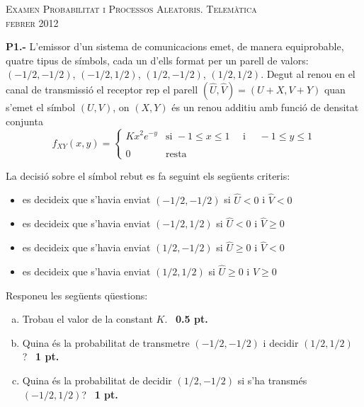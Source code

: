 \documentclass{report}
\begin{document}
\begin{center}
\textsc{Examen Probabilitat i Processos Aleatoris.
Telem\`{a}tica\\
febrer 2012}
\end{center}

\vspace{0.5 cm}
\noindent\textbf{P1.-}
L'emissor d'un sistema de comunicacions emet, de manera equiprobable, quatre
tipus de s\'imbols, cada un d'ells format per un parell de valors:
$(-1/2, -1/2)$, $(-1/2, 1/2)$, $(1/2, -1/2)$, $(1/2, 1/2)$. Degut al renou en el canal de
transmissi\'o el receptor rep el parell $(\hat{U}, \hat{V})=(U+X, V+Y)$ quan
s'emet el s\'imbol $(U, V)$, on $(X, Y)$ \'es un renou additiu amb funci\'o de
densitat conjunta
\[
f_{XY}(x, y)=\begin{cases}
K x^2 e^{-y} & \text{si } -1 \leq x \leq 1 \quad \text{ i } \quad -1 \leq y \leq 1 \\ \\
0 & \text{resta}
\end{cases}
\]

La decisi\'o sobre el s\'imbol rebut es fa seguint els seg\"uents criteris:
\begin{itemize}
\item es decideix que s'havia enviat $(-1/2, -1/2)$ si $\hat{U} < 0$ i $\hat{V} < 0$
\item es decideix que s'havia enviat $(-1/2, 1/2)$ si $\hat{U} < 0$ i $\hat{V} \geq 0$
\item es decideix que s'havia enviat $(1/2, -1/2)$ si $\hat{U} \geq 0$ i $\hat{V} < 0$
\item es decideix que s'havia enviat $(1/2, 1/2)$ si $\hat{U} \geq 0$ i $\hat{V} \geq 0$
\end{itemize}

Responeu les seg\"uents q\"uestions:
\begin{enumerate}[a)]
\item Trobau el valor de la constant $K$.\ \hfill{\textbf{ 0.5 pt.}}
\item Quina \'es la probabilitat de transmetre $(-1/2, -1/2)$ i decidir $(1/2, 1/2)$?\ \hfill{\textbf{ 1 pt.}}
\item Quina \'es la probabilitat de decidir $(1/2, -1/2)$ si s'ha transm\'es $(-1/2, 1/2)$?\ \hfill{\textbf{ 1 pt.}}
\end{enumerate}


\vspace{0.5 cm}
\end{document}
